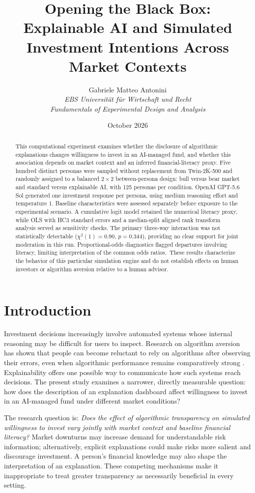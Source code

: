 \documentclass[11pt,a4paper]{article}
\title{\textbf{Opening the Black Box:}\\Explainable AI and Simulated Investment Intentions Across Market Contexts}
\author{Gabriele Matteo Antonini\\\textit{EBS Universit\"at f\"ur Wirtschaft und Recht}\\\textit{Fundamentals of Experimental Design and Analysis}}
\date{October 2026}
\newcommand{\AbstractFinding}{The primary three-way interaction was not statistically detectable ($\chi^2(1)=0.90$, $p=0.344$), providing no clear support for joint moderation in this run. Proportional-odds diagnostics flagged departures involving literacy, limiting interpretation of the common odds ratios.}
\begin{document}
\maketitle
\begin{abstract}
\noindent This computational experiment examines whether the disclosure of algorithmic explanations changes willingness to invest in an AI-managed fund, and whether this association depends on market context and an inferred financial-literacy proxy. Five hundred distinct personas were sampled without replacement from Twin-2K-500 and randomly assigned to a balanced $2\times2$ between-persona design: bull versus bear market and standard versus explainable AI, with 125 personas per condition. OpenAI GPT-5.6 Sol generated one investment response per persona, using medium reasoning effort and temperature 1. Baseline characteristics were assessed separately before exposure to the experimental scenario. A cumulative logit model retained the numerical literacy proxy, while OLS with HC3 standard errors and a median-split aligned rank transform analysis served as sensitivity checks. \AbstractFinding\ These results characterize the behavior of this particular simulation engine and do not establish effects on human investors or algorithm aversion relative to a human advisor.
\end{abstract}
\newpage

\section{Introduction}
Investment decisions increasingly involve automated systems whose internal reasoning may be difficult for users to inspect. Research on algorithm aversion has shown that people can become reluctant to rely on algorithms after observing their errors, even when algorithmic performance remains comparatively strong \citep{dietvorst2015}. Explainability offers one possible way to communicate how such systems reach decisions. The present study examines a narrower, directly measurable question: how does the description of an explanation dashboard affect willingness to invest in an AI-managed fund under different market conditions?

The research question is: \textit{Does the effect of algorithmic transparency on simulated willingness to invest vary jointly with market context and baseline financial literacy?} Market downturns may increase demand for understandable risk information; alternatively, explicit explanations could make risks more salient and discourage investment. A person's financial knowledge may also shape the interpretation of an explanation. These competing mechanisms make it inappropriate to treat greater transparency as necessarily beneficial in every setting.
\end{document}
